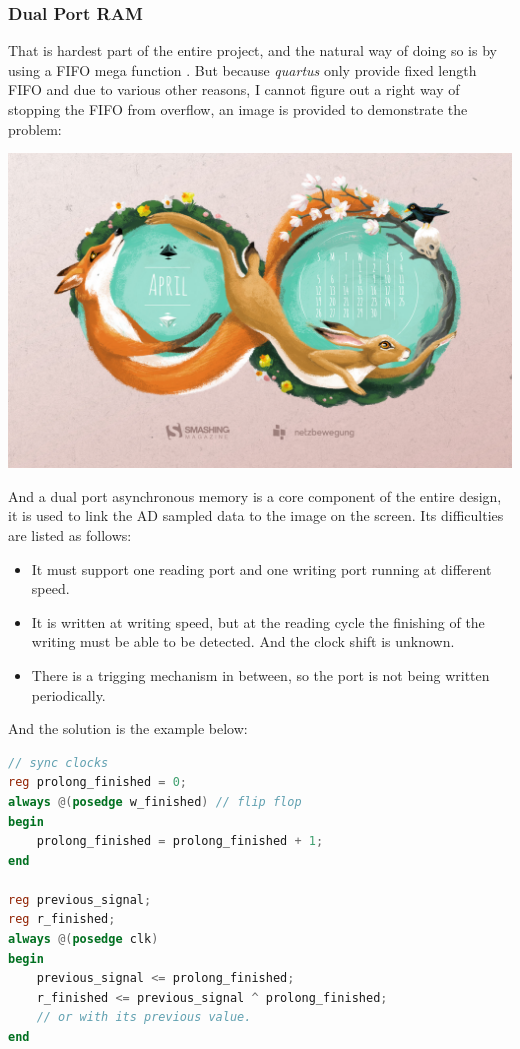 \documentclass[11pt]{scrartcl}
\begin{document}
\subsubsection{Dual Port RAM}

That is hardest part of the entire project, and the natural way of doing so is by using a FIFO mega function \cite{fifo}. But because \textit{quartus} only provide fixed length FIFO and due to various other reasons, I cannot figure out a right way of stopping the FIFO from overflow, an image is provided to demonstrate the problem:


\begin{minipage}[t]{\linewidth}

{
\includegraphics[scale = 0.3]{apr.jpg}
}
\end{minipage}
\medskip

And a dual port asynchronous memory is a core component of the entire design, it is used to link the AD sampled data to the image on the screen. Its difficulties are listed as follows:
\begin{itemize}
    \item It must support one reading port and one writing port running at different speed.
    \item It is written at writing speed, but at the reading cycle the finishing of the writing must be able to be detected. And the clock shift is unknown. 
    \item There is a trigging mechanism in between, so the port is not being written periodically.
\end{itemize}

And the solution is the example below:
\begin{lstlisting}[language=Verilog]
// sync clocks
reg prolong_finished = 0;
always @(posedge w_finished) // flip flop
begin
	prolong_finished = prolong_finished + 1;
end

reg previous_signal;
reg r_finished;
always @(posedge clk) 
begin
	previous_signal <= prolong_finished; 
	r_finished <= previous_signal ^ prolong_finished;
	// or with its previous value.
end
\end{lstlisting}
\end{document}
